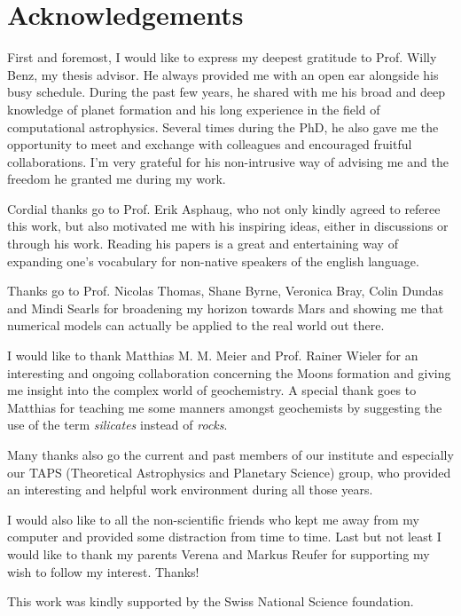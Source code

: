 \cleardoublepage
\chapter*{Acknowledgements}

First and foremost, I would like to express my deepest gratitude to Prof. Willy Benz, my thesis advisor. He always provided me with an open ear alongside his busy schedule. During the past few years, he shared with me his broad and deep knowledge of planet formation and his long experience in the field of computational astrophysics. Several times during the PhD, he also gave me the opportunity to meet and exchange with colleagues and encouraged fruitful collaborations. I'm very grateful for his non-intrusive way of advising me and the freedom he granted me during my work.

Cordial thanks go to Prof. Erik Asphaug, who not only kindly agreed to referee this work, but also motivated me with his inspiring ideas, either in discussions or through his work. Reading his papers is a great and entertaining way of expanding one's vocabulary for non-native speakers of the english language.

Thanks go to Prof. Nicolas Thomas, Shane Byrne, Veronica Bray, Colin Dundas and Mindi Searls for broadening my horizon towards Mars and showing me that numerical models can actually be applied to the real world out there.

I would like to thank Matthias M. M. Meier and Prof. Rainer Wieler for an interesting and ongoing collaboration concerning the Moons formation and giving me insight into the complex world of geochemistry. A special thank goes to Matthias for teaching me some manners amongst geochemists by suggesting the use of the term \emph{silicates} instead of \emph{rocks}.

Many thanks also go the current and past members of our institute and especially our TAPS (Theoretical Astrophysics and Planetary Science) group, who provided an interesting and helpful work environment during all those years.

I would also like to all the non-scientific friends who kept me away from my computer and provided some distraction from time to time. Last but not least I would like to thank my parents Verena and Markus Reufer for supporting my wish to follow my interest. Thanks!

This work was kindly supported by the Swiss National Science foundation.
